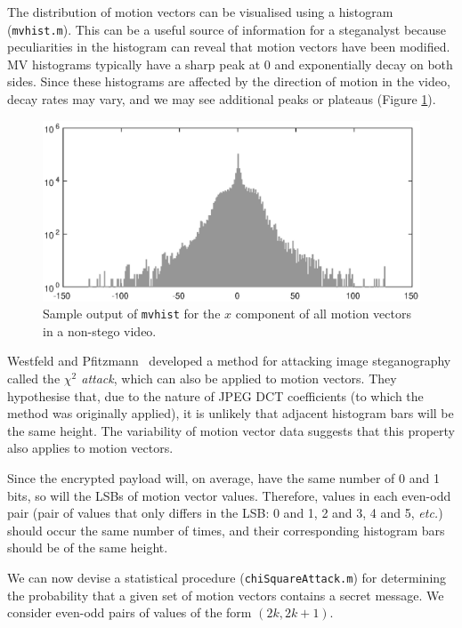 \documentclass[12pt,british,twoside,notitlepage,usenames,dvipsnames,hypens,final]{report}
\numberwithin{equation}{section}
\numberwithin{figure}{section}
\begin{document}
The distribution of motion vectors can be visualised using a histogram (\texttt{mvhist.m}). This can be a useful source of information for a steganalyst because peculiarities in the histogram can reveal that motion vectors have been modified. MV histograms typically have a sharp peak at 0 and exponentially decay on both sides. Since these histograms are affected by the direction of motion in the video, decay rates may vary, and we may see additional peaks or plateaus (Figure \ref{fig:histogram-example}).

\begin{figure}[tbh]
\centerline{\includegraphics[scale=0.75]{img/histogram-example.eps}}
\caption{Sample output of \texttt{mvhist} for the $x$ component of all motion vectors in a non-stego video.}
\label{fig:histogram-example}
\end{figure}

Westfeld and Pfitzmann~\cite{westfeld1999attacks} developed a method for attacking image steganography called the \emph{$\chi^2$ attack}, which can also be applied to motion vectors. They hypothesise that, due to the nature of JPEG DCT coefficients (to which the method was originally applied), it is unlikely that adjacent histogram bars will be the same height. The variability of motion vector data suggests that this property also applies to motion vectors.

Since the encrypted payload will, on average, have the same number of 0 and 1 bits, so will the LSBs of motion vector values. Therefore, values in each even-odd pair (pair of values that only differs in the LSB: 0 and 1, 2 and 3, 4 and 5, \emph{etc.}) should occur the same number of times, and their corresponding histogram bars should be of the same height.

We can now devise a statistical procedure (\texttt{chiSquareAttack.m}) for determining the probability that a given set of motion vectors contains a secret message. We consider even-odd pairs of values of the form $(2k, 2k+1)$. 
\end{document}
